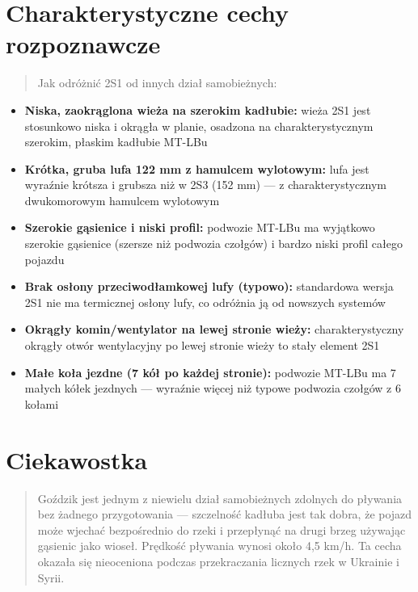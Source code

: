 \documentclass[12pt,openany,oneside]{book}
\providecommand{\tightlist}{%
  \setlength{\itemsep}{0pt}\setlength{\parskip}{0pt}}
\begin{document}
\section{Charakterystyczne cechy
rozpoznawcze}\label{charakterystyczne-cechy-rozpoznawcze-9}

\begin{quote}
Jak odróżnić 2S1 od innych dział samobieżnych:
\end{quote}

\begin{itemize}
\tightlist
\item
  \textbf{Niska, zaokrąglona wieża na szerokim kadłubie:} wieża 2S1 jest
  stosunkowo niska i okrągła w planie, osadzona na charakterystycznym
  szerokim, płaskim kadłubie MT-LBu
\item
  \textbf{Krótka, gruba lufa 122 mm z hamulcem wylotowym:} lufa jest
  wyraźnie krótsza i grubsza niż w 2S3 (152 mm) --- z charakterystycznym
  dwukomorowym hamulcem wylotowym
\item
  \textbf{Szerokie gąsienice i niski profil:} podwozie MT-LBu ma
  wyjątkowo szerokie gąsienice (szersze niż podwozia czołgów) i bardzo
  niski profil całego pojazdu
\item
  \textbf{Brak osłony przeciwodłamkowej lufy (typowo):} standardowa
  wersja 2S1 nie ma termicznej osłony lufy, co odróżnia ją od nowszych
  systemów
\item
  \textbf{Okrągły komin/wentylator na lewej stronie wieży:}
  charakterystyczny okrągły otwór wentylacyjny po lewej stronie wieży to
  stały element 2S1
\item
  \textbf{Małe koła jezdne (7 kół po każdej stronie):} podwozie MT-LBu
  ma 7 małych kółek jezdnych --- wyraźnie więcej niż typowe podwozia
  czołgów z 6 kołami
\end{itemize}

\section{Ciekawostka}\label{ciekawostka-9}

\begin{quote}
Goździk jest jednym z niewielu dział samobieżnych zdolnych do pływania
bez żadnego przygotowania --- szczelność kadłuba jest tak dobra, że
pojazd może wjechać bezpośrednio do rzeki i przepłynąć na drugi brzeg
używając gąsienic jako wioseł. Prędkość pływania wynosi około 4,5 km/h.
Ta cecha okazała się nieoceniona podczas przekraczania licznych rzek w
Ukrainie i Syrii.
\end{quote}
\end{document}
